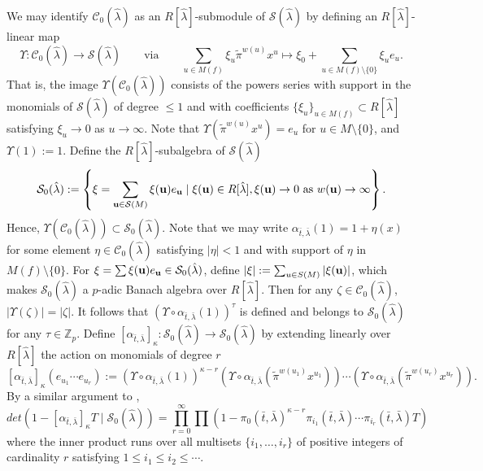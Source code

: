 \documentclass{article}
\theoremstyle{remark}
\def\bb #1{ {\mathbb #1} }
\def\c #1{ {\mathcal #1} }
\def\b #1{ {\bf #1} }
\begin{document}
We may identify $\c C_0(\hat \lambda)$ as an $R[\hat \lambda]$-submodule  of $\c S(\hat \lambda)$ by defining an $R[\hat \lambda]$-linear map 
\[
\Upsilon: \c C_0(\hat \lambda) \rightarrow \c S(\hat \lambda) \qquad  \text{via} \qquad  \sum_{u \in M(f)} \xi_u \tilde \pi^{w(u)} x^u \longmapsto \xi_0 + \sum_{u \in M(f)\setminus \{0\}} \xi_u e_u.
\]
That is, the image $\Upsilon(\c C_0(\hat \lambda))$ consists of the powers series with support in the monomials of $\c S(\hat \lambda)$ of degree $\leq 1$ and with coefficients $\{\xi_u \}_{u \in M(f)} \subset R[\hat \lambda]$ satisfying $\xi_u \rightarrow 0$ as $u \rightarrow \infty$. Note that $\Upsilon(\tilde \pi^{w(u)}x^u) = e_u$ for $u \in M \setminus \{ 0 \}$, and $\Upsilon(1) := 1$. 
Define the $R[\hat \lambda]$-subalgebra of $\c S(\hat \lambda) $
\[
\c S_0(\hat \lambda) := \left\{ \xi = \sum_{\b u \in \c S(M)} \xi(\b u) e_{\b u} \mid \xi(\b u) \in R[\hat \lambda], \xi(\b u) \rightarrow 0 \text{ as } w(\b u) \rightarrow \infty \right\}.
\]
Hence, $\Upsilon(\c C_0(\hat \lambda)) \subset \c S_0(\hat \lambda)$. Note that we may write  $\alpha_{\bar t, \bar \lambda}(1) = 1 + \eta(x)$ for some element $\eta \in \c C_0(\hat \lambda)$ satisfying $|\eta| < 1$ and with support of $\eta$ in $M(f)\setminus \{ 0 \}$. For $\xi = \sum \xi(\b u) e_{\b u} \in \c S_0(\hat \lambda)$, define $| \xi | := \sum_{u \in S(M)}  | \xi(\b u) |$, which makes $\c S_0(\hat \lambda)$ a $p$-adic Banach algebra over $R[\hat \lambda]$. Then for any $\zeta \in \c C_0(\hat \lambda)$, $|\Upsilon(\zeta)| = |\zeta|$. It follows that $(\Upsilon \circ \alpha_{\bar t, \bar \lambda}( 1 ))^{\tau}$ is defined and belongs to $\c S_0(\hat \lambda)$ for any $\tau \in \bb Z_p$. Define $[\alpha_{\bar t, \bar \lambda}]_\kappa: \c S_0(\hat \lambda) \rightarrow \c S_0(\hat \lambda)$ by extending linearly over $R[\hat \lambda]$ the action on monomials of degree $r$ 
\[
[\alpha_{\bar t, \bar \lambda}]_\kappa( e_{u_1} \cdots e_{u_r} ) := (\Upsilon \circ \alpha_{\bar t, \bar \lambda} (1) )^{\kappa - r} (\Upsilon \circ \alpha_{\bar t, \bar \lambda} ( \tilde \pi^{w(u_1)} x^{u_1})) \cdots ( \Upsilon \circ \alpha_{\bar t, \bar \lambda} (\tilde \pi^{w(u_r)} x^{u_r})).
\]
By a similar argument to \cite[Corollary 2.4, part 2]{MR3249829}, 
\[
det(1 - [\alpha_{\bar t, \bar \lambda}]_\kappa T \mid \c S_0(\hat \lambda) ) = \prod_{r = 0}^\infty \prod \left(1 - \pi_0(\bar t, \bar \lambda)^{\kappa - r} \pi_{i_1}(\bar t, \bar \lambda) \cdots \pi_{i_r}(\bar t, \bar \lambda)  T \right)
\]
where the inner product runs over all multisets $\{i_1, \ldots, i_r\}$ of positive integers of cardinality $r$ satisfying $1 \leq i_1 \leq i_2 \leq \cdots$.
\end{document}

